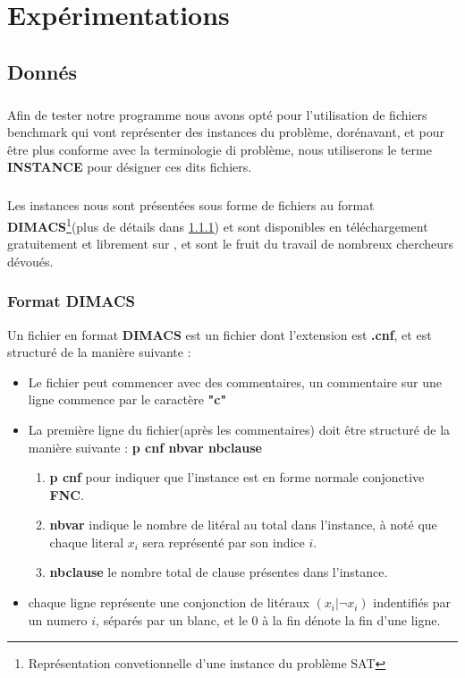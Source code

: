 \chapter{Expérimentations}
\section{Donnés}\label{dataSet}
\paragraph{}Afin de tester notre programme nous avons opté pour l'utilisation de fichiers benchmark qui vont représenter des instances du problème, dorénavant, et pour être plus conforme avec la terminologie di problème, nous utiliserons le terme \textbf{INSTANCE} pour désigner ces dits fichiers.
\paragraph{}
Les instances nous sont présentées sous forme de fichiers au format \textbf{DIMACS}\footnote{Représentation convetionnelle d'une instance du problème SAT}(plus de détails dans \ref{par:dimacs}) et sont disponibles en téléchargement gratuitement et librement sur \cite{Benchmark}, et sont le fruit du travail de nombreux chercheurs dévoués.
\subsection{Format DIMACS}\label{par:dimacs}
Un fichier en format \textbf{DIMACS} est un fichier dont l'extension est \textbf{.cnf}, et est structuré de la manière suivante : \\
\begin{itemize}
	\item Le fichier peut commencer avec des commentaires, un commentaire sur une ligne commence par le caractère \textbf{"c"}
	\item La première ligne du fichier(après les commentaires) doit être structuré de la manière suivante : \textbf{p cnf nbvar nbclause}
	\begin{enumerate}
		\item \textbf{p cnf} pour indiquer que l'instance est en forme normale conjonctive \textbf{FNC}.
		\item \textbf{nbvar} indique le nombre de litéral au total dans l'instance, à noté que chaque literal $x_{i}$ sera représenté par son indice $i$.
		\item \textbf{nbclause} le nombre total de clause présentes dans l'instance.
	\end{enumerate}
	\item chaque ligne représente une conjonction de litéraux $(x_{i} \vert \lnot x_{i})$ indentifiés par un numero $i$, séparés par un blanc, et le 0 à la fin dénote la fin d'une ligne.
\end{itemize}
